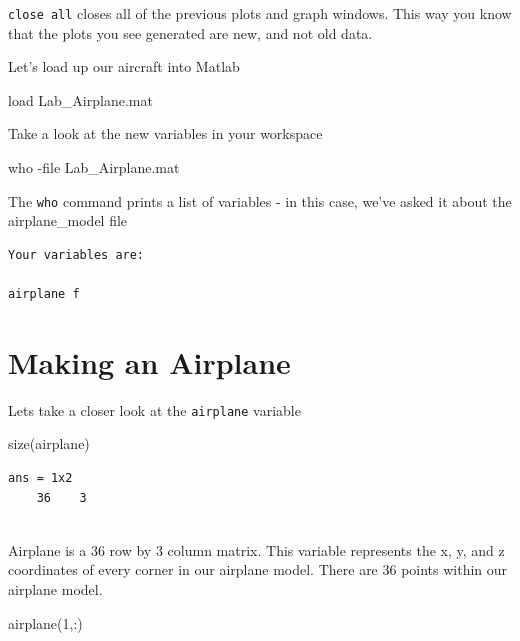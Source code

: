 \documentclass[
]{book}
\newenvironment{Shaded}{\begin{snugshade}}{\end{snugshade}}
\newcommand{\DecValTok}[1]{\textcolor[rgb]{0.00,0.00,0.81}{#1}}
\newcommand{\FunctionTok}[1]{\textcolor[rgb]{0.00,0.00,0.00}{#1}}
\newcommand{\NormalTok}[1]{#1}
\newcommand{\SpecialCharTok}[1]{\textcolor[rgb]{0.00,0.00,0.00}{#1}}
\theoremstyle{definition}
\theoremstyle{definition}
\theoremstyle{definition}
\theoremstyle{definition}
\theoremstyle{remark}
\begin{document}
\texttt{close\ all} closes all of the previous plots and graph windows. This way you know that the plots you see generated are new, and not old data.

Let's load up our aircraft into Matlab

\begin{Shaded}
\begin{Highlighting}[]
\NormalTok{load Lab\_Airplane.mat}
\end{Highlighting}
\end{Shaded}

Take a look at the new variables in your workspace

\begin{Shaded}
\begin{Highlighting}[]
\NormalTok{who }\SpecialCharTok{{-}}\NormalTok{file Lab\_Airplane.mat}
\end{Highlighting}
\end{Shaded}

The \texttt{who} command prints a list of variables - in this case, we've asked it about the airplane\_model file

\begin{verbatim}
Your variables are: 

airplane f
\end{verbatim}

\hypertarget{making-an-airplane}{%
\section{Making an Airplane}\label{making-an-airplane}}

Lets take a closer look at the \texttt{airplane} variable

\begin{Shaded}
\begin{Highlighting}[]
\FunctionTok{size}\NormalTok{(airplane)}
\end{Highlighting}
\end{Shaded}

\begin{verbatim}
ans = 1x2
    36    3
    
\end{verbatim}

Airplane is a 36 row by 3 column matrix. This variable represents the x, y, and z coordinates of every corner in our airplane model. There are 36 points within our airplane model.

\begin{Shaded}
\begin{Highlighting}[]
\FunctionTok{airplane}\NormalTok{(}\DecValTok{1}\NormalTok{,}\SpecialCharTok{:}\NormalTok{)}
\end{Highlighting}
\end{Shaded}
\end{document}
